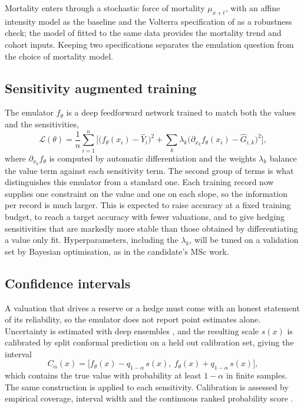 \documentclass[12pt,a4paper]{article}
\begin{document}
Mortality enters through a stochastic force of mortality $\mu_{x+t}$, with an affine intensity model as the baseline and the Volterra specification of \citet{li2026valuation} as a robustness check; the model of \citet{lee1992modeling} fitted to the same data provides the mortality trend and cohort inputs. Keeping two specifications separates the emulation question from the choice of mortality model.

\subsection{Sensitivity augmented training}
The emulator $f_\theta$ is a deep feedforward network trained to match both the values and the sensitivities,
\begin{equation}
\mathcal L(\theta)=\frac1n\sum_{i=1}^{n}\Big[\big(f_\theta(x_i)-\widehat Y_i\big)^2
+\sum_{k}\lambda_k\big(\partial_{x_k} f_\theta(x_i)-\widehat G_{i,k}\big)^2\Big],
\label{eq:sobolev}
\end{equation}
where $\partial_{x_k} f_\theta$ is computed by automatic differentiation and the weights $\lambda_k$ balance the value term against each sensitivity term. The second group of terms is what distinguishes this emulator from a standard one. Each training record now supplies one constraint on the value and one on each slope, so the information per record is much larger. This is expected to raise accuracy at a fixed training budget, to reach a target accuracy with fewer valuations, and to give hedging sensitivities that are markedly more stable than those obtained by differentiating a value only fit. Hyperparameters, including the $\lambda_k$, will be tuned on a validation set by Bayesian optimisation, as in the candidate's MSc work.

\subsection{Confidence intervals}
A valuation that drives a reserve or a hedge must come with an honest statement of its reliability, so the emulator does not report point estimates alone. Uncertainty is estimated with deep ensembles \citep{lakshminarayanan2017simple}, and the resulting scale $s(x)$ is calibrated by split conformal prediction \citep{lei2018distribution, romano2019conformalized} on a held out calibration set, giving the interval
\begin{equation}
C_\alpha(x)=\big[f_\theta(x)-q_{1-\alpha}\,s(x),\ f_\theta(x)+q_{1-\alpha}\,s(x)\big],
\end{equation}
which contains the true value with probability at least $1-\alpha$ in finite samples. The same construction is applied to each sensitivity. Calibration is assessed by empirical coverage, interval width and the continuous ranked probability score \citep{gneiting2007strictly}.
\end{document}
